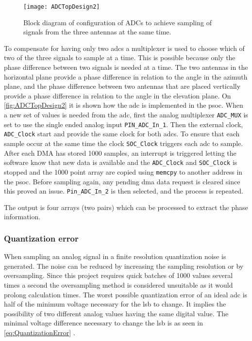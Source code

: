 \begin{figure}[h!]
\centering
\texttt{[image: ADCTopDesign2]}
\caption{Block diagram of configuration of ADCs to achieve sampling of signals from the three antennas at the same time.}
\label{fig:ADCTopDesign2}
\end{figure}

To compensate for having only two \glspl{adc} a multiplexer is used to choose which of two of the three signals to sample at a time. This is possible because only the phase difference between two signals is needed at a time. The two antennas in the horizontal plane provide a phase difference in relation to the angle in the azimuth plane, and the phase difference between two antennas that are placed vertically provide a phase difference in relation to the angle in the elevation plane.
On \autoref{fig:ADCTopDesign2} it is shown how the \gls{adc} is implemented in the \gls{psoc}. When a new set of values is needed from the \gls{adc}, first the analog multiplexer \texttt{ADC_MUX} is set to use the single ended analog input \texttt{PIN_ADC_In_1}. Then the external clock, \texttt{ADC_Clock} start and provide the same clock for both \glspl{adc}. To ensure that each sample occur at the same time the clock \texttt{SOC_Clock} triggers each \gls{adc} to sample. After each DMA has stored 1000 samples, an interrupt is triggered letting the software know that new data is available and the \texttt{ADC_Clock} and \texttt{SOC_Clock} is stopped and the 1000 point array are copied using \texttt{memcpy} to another address in the \gls{psoc}. Before sampling again, any pending \gls{dma} data request is cleared since this proved an issue. \texttt{Pin_ADC_In_2} is then selected, and the process is repeated.

The output is four arrays (two pairs) which can be processed to extract the phase information.

\subsubsection{Quantization error}\label{subsec:quantization_error}
When sampling an analog signal in a finite resolution quantization noise is generated. The noise can be reduced by increasing the sampling resolution or by oversampling. Since this project requires quick batches of 1000 values several times a second the oversampling method is considered unsuitable as it would prolong calculation times. 
The worst possible quantization error of an ideal \gls{adc} is half of the minimum voltage necessary for the \gls{lsb} to change. It implies the possibility of two different analog values having the same digital value. The minimal voltage difference necessary to change the \gls{lsb} is as seen in \autoref{eq:QuantizationError} \citep{AppReport:ADCQuantization}.

